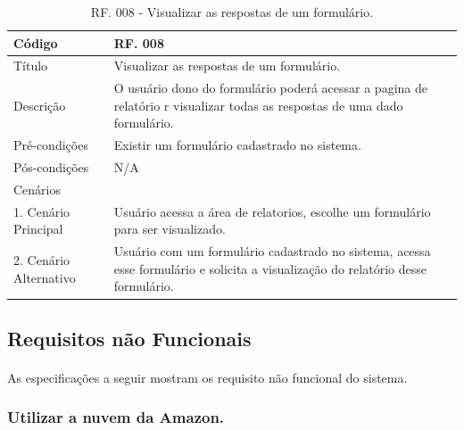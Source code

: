 \documentclass[11pt]{article}
\begin{document}
        \begin{table}[h]
          \begin{center}
            \begin{tabular}{ | p{5cm} | p{10cm} | }
              \hline
              Código\cellcolor{gray} & RF. 008\cellcolor{gray} \\
              \hline
              Título & Visualizar as respostas de um formulário. \\
              \hline
              Descrição & O usuário dono do formulário poderá acessar a pagina de relatório r visualizar todas as respostas de uma dado formulário. \\
              \hline
              Pré-condições & Existir um formulário cadastrado no sistema. \\
              \hline
              Pós-condições & N/A \\
              \hline
              Cenários &   \\
              \hline
              1.  Cenário Principal & Usuário acessa a área de relatorios, escolhe um formulário para ser visualizado. \\
              \hline
              2.  Cenário Alternativo & Usuário com um formulário cadastrado no sistema, acessa esse formulário e solicita a visualização do relatório desse formulário. \\
              \hline
            \end{tabular}
            \caption{RF. 008 - Visualizar as respostas de um formulário.}
          \end{center}
        \end{table}

    \clearpage

    \subsection{Requisitos não Funcionais}
    
      \paragraph{}
      As especificações a seguir mostram os requisito não funcional do sistema.

      \subsubsection{Utilizar a nuvem da Amazon.}
\end{document}
